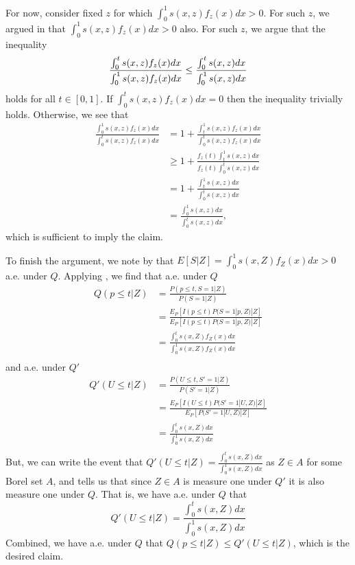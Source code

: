 \documentclass{article}
\begin{document}
\begin{appendix}
For now, consider fixed $z$ for which $\int_0^1 s(x, z) f_z(x) dx >0$. For such $z$, we argued in  that 
 $\int_0^1 s(x, z) f_z(x) dx >0$ also. For such $z$, we argue that the inequality 
 \begin{equation*}
    \frac{\int_{0}^{t} s(x, z) f_z(x) dx }{\int_{0}^{1} s(x, z) f_z(x) dx } \leq \frac{\int_{0}^{t} s(x, z) dx}{\int_{0}^{1} s(x, z) dx } \\
 \end{equation*}
 holds for all $t\in[0, 1]$. If $\int_{0}^{t} s(x, z) f_z(x) dx =0$ then the inequality trivially holds. Otherwise, we see that 
 \begin{align*}
    \frac{ \int_{0}^{1} s(x, z) f_z(x) dx }{\int_{0}^{t} s(x, z) f_z(x) dx } &= 1 + \frac{\int_{t}^{1} s(x, z) f_z(x) dx }{\int_{0}^{t} s(x, z) f_z(x) dx }\\
    &\geq 1 + \frac{f_z(t)\int_{t}^{1} s(x ,z) dx }{f_z(t)\int_{0}^{t} s(x, z)  dx }\\
    &= 1 + \frac{\int_{t}^{1} s(x, z) dx }{\int_{0}^{t} s(x, z)  dx }\\
    &= \frac{ \int_{0}^{1} s(x, z) dx }{\int_{0}^{t} s(x, z)  dx },
\end{align*}
which is sufficient to imply the claim.

To finish the argument, we note by  that $E[S|Z] = \int_0^1 s(x, Z) f_Z(x) dx >0 $ a.e. under $Q$. Applying , we find that a.e. under $Q$
\begin{align*}
    Q(p \leq t |Z) &= \frac{P(p \leq t, S = 1 | Z )}{P(S = 1 | Z)}\\
                    &= \frac{E_P[I(p \leq t)P(S = 1 | p, Z ) | Z ] }{E_P[I(p \leq t)P( S = 1 | p, Z)| Z]}\\
                    &= \frac{\int_0^t s(x, Z) f_Z(x) dx }{\int_0^1 s(x, Z) f_Z(x) dx}\\
\end{align*}
and a.e. under $Q'$ 
\begin{align*}
    Q'(U \leq t |Z) &= \frac{P(U \leq t, S' = 1 | Z )}{P(S' = 1 | Z)}\\
                    &= \frac{E_P[I(U \leq t) P( S' = 1 | U, Z ) | Z ] }{E_P[P(S' = 1 | U, Z)| Z]}\\
                    &= \frac{\int_0^t s(x, Z) dx }{\int_0^1 s(x, Z) dx}\\
\end{align*}
But, we can write the event that $Q'(U \leq t |Z) = \frac{\int_0^t s(x, Z) dx }{\int_0^1 s(x, Z) dx}$ as $Z \in A$ for some Borel set $A$, and  tells us that since $Z \in A$ is measure one under $Q'$ it is also measure one under $Q$. That is, we have a.e. under $Q$ that 
\begin{equation*}
    Q'(U \leq t |Z) = \frac{\int_0^t s(x, Z) dx }{\int_0^1 s(x, Z) dx}
\end{equation*}
Combined, we have a.e. under $Q$ that $ Q(p \leq t |Z) \leq Q'(U \leq t |Z)$, which is the desired claim. 


\end{appendix}
\end{document}
